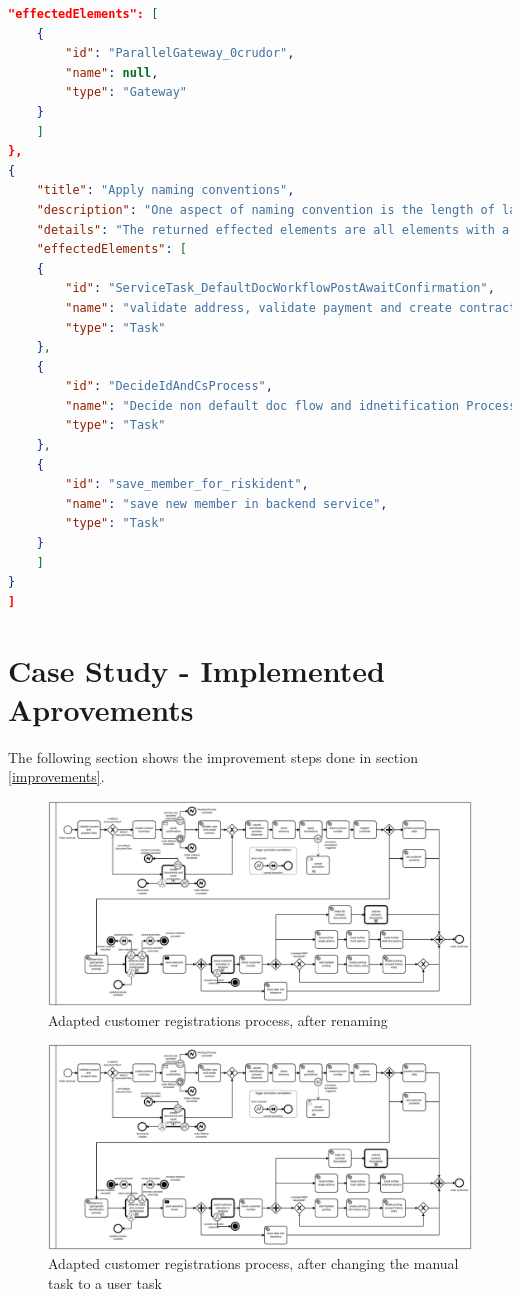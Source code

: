 \begin{lstlisting}[breaklines=true, language=json]
	"effectedElements": [
	{
		"id": "ParallelGateway_0crudor",
		"name": null,
		"type": "Gateway"
	}
	]
},
{
	"title": "Apply naming conventions",
	"description": "One aspect of naming convention is the length of labels, this rule scanns the bpmn for rlements with long labels (> 5 words)",
	"details": "The returned effected elements are all elements with a label that has more than 5 words",
	"effectedElements": [
	{
		"id": "ServiceTask_DefaultDocWorkflowPostAwaitConfirmation",
		"name": "validate address, validate payment and create contract",
		"type": "Task"
	},
	{
		"id": "DecideIdAndCsProcess",
		"name": "Decide non default doc flow and idnetification Process",
		"type": "Task"
	},
	{
		"id": "save_member_for_riskident",
		"name": "save new member in backend service",
		"type": "Task"
	}
	]
}
]
\end{lstlisting}
\section{Case Study - Implemented Aprovements}\label{BPMN-improvements}
The following section shows the improvement steps done in section \ref{improvements}.

\begin{figure}
	\centering
	\includegraphics[width=1.7\columnwidth, angle=90]{graphics/register-customer/2-registercustomer-renaming-bpmn.pdf}
	\caption{Adapted customer registrations process, after renaming} 
	\label{fig:process-renaming} 
\end{figure}
\begin{figure}[H]
	\centering
	\includegraphics[width=1.7\columnwidth, angle=90]{graphics/register-customer/3-registercustomer-manual-bpmn.pdf}
	\caption{Adapted customer registrations process, after changing the manual task to a user task} 
	\label{fig:process-manual} 
\end{figure}

